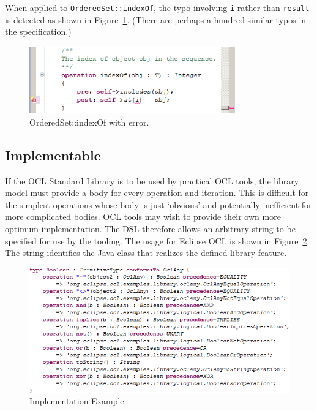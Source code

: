 \documentclass{eceasst}
\begin{document}
When applied to \verb|OrderedSet::indexOf|, the typo involving \verb|i| rather than \verb|result| is detected as shown in Figure~\ref{fig:OrderedSet_indexOf}. (There are perhaps a hundred similar typos in the specification.)

\begin{figure}
  \begin{center}
    \includegraphics[width=3.5in]{OrderedSet_indexOf.png}
  \end{center}
  \caption{OrderedSet::indexOf with error.}
  \label{fig:OrderedSet_indexOf}
\end{figure}

\subsection{Implementable}

If the OCL Standard Library is to be used by practical OCL tools, the library model must provide a body for every operation and iteration. This is difficult for the simplest operations whose body is just `obvious' and potentially inefficient for more complicated bodies. OCL tools may wish to provide their own more optimum implementation. The DSL therefore allows an arbitrary string to be specified for use by the tooling. The usage for Eclipse OCL is shown in Figure~\ref{fig:ImplementationExample}. The string identifies the Java class that realizes the defined library feature.

\begin{figure}
  \begin{center}
    \includegraphics[width=5.0in]{ImplementationExample.png}
  \end{center}
  \caption{Implementation Example.}
  \label{fig:ImplementationExample}
\end{figure}
\end{document}
